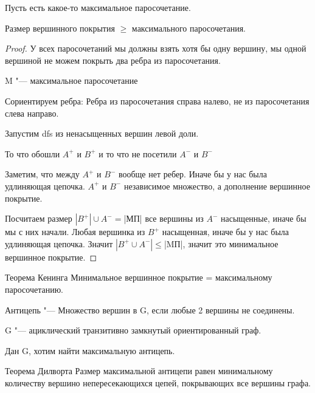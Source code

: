 \begin{theorem}
Пусть есть какое-то максимальное паросочетание. 

Размер вершинного покрытия $\ge$ максимального паросочетания. 
\end{theorem}
\begin{proof}
У всех паросочетаний мы должны взять хотя бы одну вершину, мы одной вершиной не можем покрыть два ребра из паросочетания. 
  
M "--- максимальное паросочетание

Сориентируем ребра: Ребра из паросочетания справа налево, не из паросочетания слева направо.

Запустим dfs из ненасыщенных вершин левой доли. 

То что обошли $A^+$ и $B^+$ и то что не посетили $A^{-}$ и $B^-$

Заметим, что между $A^{+}$ и $B^{-}$ вообще нет ребер. Иначе бы у нас была удлиняющая цепочка.
$A^{+}$ и $B^{-}$ независимое множество, а дополнение вершинное покрытие.

Посчитаем размер $|B^+| \cup A^{-} = $|МП| все вершины из $A^-$ насыщенные, иначе бы мы с них начали. Любая вершинка из $B^{+}$
насыщенная, иначе бы у нас была удлиняющая цепочка. Значит $|B^+ \cup A^-|\le $|MП|, значит это минимальное вершинное покрытие.
\end{proof}

\begin{theorem}{Теорема Кенинга}
 Минимальное вершинное покрытие = максимальному паросочетанию.     
\end{theorem}

\begin{Def}
Антицепь "--- Множество вершин в G, если любые 2 вершины не соединены.
\end{Def}

G "--- ациклический транзитивно замкнутый ориентированный граф.

Дан G, хотим найти максимальную антицепь.

\begin{theorem}{Теорема Дилворта}
Размер максимальной антицепи равен минимальному количеству вершино непересекающихся цепей, покрывающих все вершины графа.
\end{theorem}


